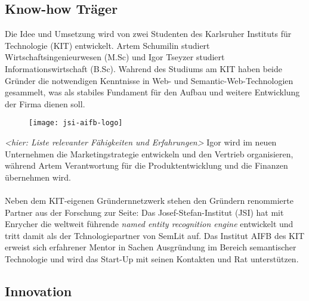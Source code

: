 
\subsection{Know-how Träger}
Die Idee und Umsetzung wird von zwei Studenten des Karlsruher Instituts für Technologie (KIT) entwickelt. {\color{orange}Artem Schumilin} studiert Wirtschaftsingenieurwesen (M.Sc) und {\color{orange}Igor Tseyzer} studiert Informationswirtschaft (B.Sc). Wahrend des Studiums am KIT haben beide Gründer die notwendigen Kenntnisse in Web- und Semantic-Web-Technologien gesammelt, was als stabiles Fundament für den Aufbau und weitere Entwicklung der Firma dienen soll. 
\begin{figure}[h!]
\centering
\texttt{[image: jsi-aifb-logo]}
\end{figure}
\emph{<hier: Liste relevanter Fähigkeiten und Erfahrungen>}
Igor wird im neuen Unternehmen die Marketingstrategie entwickeln und den Vertrieb organisieren, während Artem Verantwortung für die Produktentwicklung und die Finanzen übernehmen wird. 
\\
\\
Neben dem KIT-eigenen Gründernnetzwerk stehen den Gründern renommierte Partner aus der Forschung zur Seite: 
Das Josef-Stefan-Institut (JSI) hat mit Enrycher die weltweit führende \emph{named entity recognition engine} entwickelt und tritt damit als der Tchnologiepartner von SemLit auf. 
Das Institut AIFB des KIT erweist sich erfahrener Mentor in Sachen Ausgründung im Bereich semantischer Technologie und wird das Start-Up mit seinen Kontakten und Rat unterstützen.


\subsection{Innovation}

